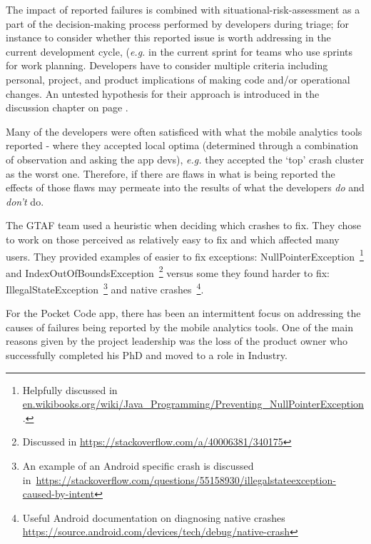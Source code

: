 The impact of reported failures is combined with situational-risk-assessment as a part of the decision-making process performed by developers during triage; for instance to consider whether this reported issue is worth addressing in the current development cycle, (\textit{e.g.} in the current sprint for teams who use sprints for work planning. Developers have to consider multiple criteria including personal, project, and product implications of making code and/or operational changes. An untested hypothesis for their approach is introduced in the discussion chapter on page \pageref{discussion-decision-making-by-dev-teams-section}.


Many of the developers were often satisficed with what the mobile analytics tools reported - where they accepted local optima (determined through a combination of observation and asking the app devs), \textit{e.g.} they accepted the `top' crash cluster as the worst one. Therefore, if there are flaws in what is being reported the effects of those flaws may permeate into the results of what the developers \textit{do} and \textit{don't} do. 


The GTAF team used a heuristic when deciding which crashes to fix. They chose to work on those perceived as relatively easy to fix and which affected many users. They provided examples of easier to fix exceptions: NullPointerException~\footnote{Helpfully discussed in \href{https://en.wikibooks.org/wiki/Java\_Programming/Preventing\_NullPointerException}{en.wikibooks.org/wiki/Java\_Programming/Preventing\_NullPointerException}.} and IndexOutOfBoundsException~\footnote{Discussed in \url{https://stackoverflow.com/a/40006381/340175}} versus some they found harder to fix: IllegalStateException~\footnote{An example of an Android specific crash is discussed in~\url{https://stackoverflow.com/questions/55158930/illegalstateexception-caused-by-intent}} and native crashes~\footnote{Useful Android documentation on diagnosing native crashes \url{https://source.android.com/devices/tech/debug/native-crash}}.



For the Pocket Code app, there has been an intermittent focus on addressing the causes of failures being reported by the mobile analytics tools. One of the main reasons given by the project leadership was the loss of the product owner who successfully completed his PhD and moved to a role in Industry. 

